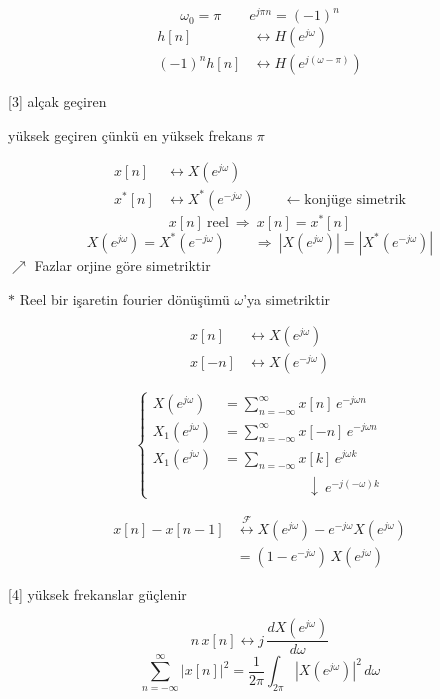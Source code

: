 \documentclass[11pt,a4paper]{article}
\begin{document}
\[ \omega_0=\pi \qquad e^{j\pi n}=(-1)^n \]
\begin{align*}
h[n] &\longleftrightarrow H(e^{j\omega})\\
(-1)^n h[n] &\longleftrightarrow H(e^{j(\omega-\pi)})
\end{align*}

[3]
alçak geçiren

yüksek geçiren çünkü en yüksek frekans $\pi$

\begin{align*}
x[n] &\longleftrightarrow X(e^{j\omega})\\
x^{*}[n] &\longleftrightarrow X^{*}(e^{-j\omega}) \qquad \leftarrow \text{konjüge simetrik}
\end{align*}
\[ x[n]\ \text{reel} \ \Rightarrow\ x[n]=x^{*}[n] \]
\[ X(e^{j\omega})=X^{*}(e^{-j\omega}) \qquad \Rightarrow\ |X(e^{j\omega})|=|X^{*}(e^{-j\omega})| \]
$\nearrow$ Fazlar orjine göre simetriktir

$\ast$ Reel bir işaretin fourier dönüşümü $\omega$'ya simetriktir

\begin{align*}
x[n] &\longleftrightarrow X(e^{j\omega})\\
x[-n] &\longleftrightarrow X(e^{-j\omega})
\end{align*}

\[
\left\{\begin{aligned}
X(e^{j\omega}) &= \sum_{n=-\infty}^{\infty} x[n]\,e^{-j\omega n}\\
X_1(e^{j\omega}) &= \sum_{n=-\infty}^{\infty} x[-n]\,e^{-j\omega n}\\
X_1(e^{j\omega}) &= \sum_{n=-\infty} x[k]\,e^{j\omega k}\\
&\hspace{6em}\downarrow\ e^{-j(-\omega)k}
\end{aligned}\right.
\]

\begin{align*}
x[n]-x[n-1] &\overset{\mathcal{F}}{\longleftrightarrow} X(e^{j\omega})-e^{-j\omega}X(e^{j\omega})\\
&= (1-e^{-j\omega})\,X(e^{j\omega})
\end{align*}

[4]
yüksek frekanslar güçlenir

\[ n\,x[n] \longleftrightarrow j\,\frac{dX(e^{j\omega})}{d\omega} \]
\[ \sum_{n=-\infty}^{\infty}|x[n]|^{2} = \frac{1}{2\pi}\int_{2\pi}|X(e^{j\omega})|^{2}\,d\omega \]
 \qquad {}
\end{document}
